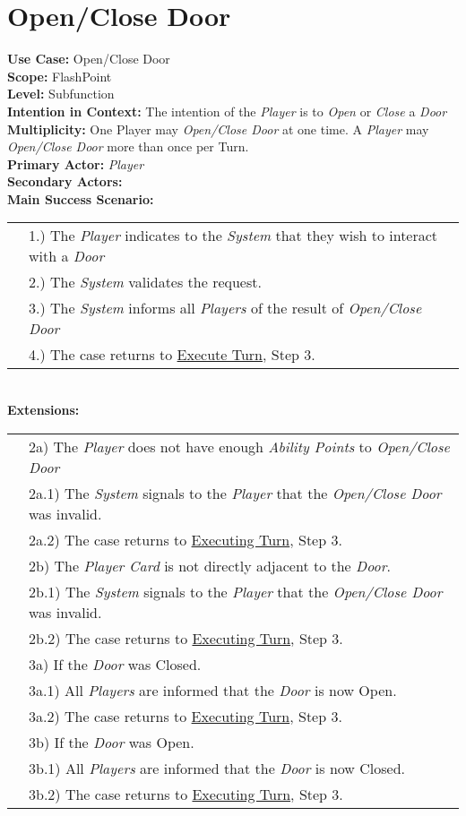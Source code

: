 \documentclass{article}
\begin{document}
	\section*{Open/Close Door}
	\textbf{Use Case:} Open/Close Door\\
	\textbf{Scope:} FlashPoint\\
	\textbf{Level:} Subfunction\\
	\textbf{Intention in Context:} The intention of the \textit{Player} is to \textit{Open} or \textit{Close} a \textit{Door} \\
	\textbf{Multiplicity: } One Player may \textit{Open/Close Door} at one time. A \textit{Player} may \textit{Open/Close Door} more than once per Turn.\\
	\textbf{Primary Actor:} \textit{Player}\\
	\textbf{Secondary Actors:}\\
	\textbf{Main Success Scenario:}\\
	\begin{tabular}{l l}
		&1.) The \textit{Player} indicates to the \textit{System} that they wish to interact with a \textit{Door} \\
		&2.) The \textit{System} validates the request. \\
		&3.) The \textit{System} informs all \textit{Players} of the result of \textit{Open/Close Door}\\
		&4.) The case returns to \underline{Execute Turn}, Step 3.\\
	\end{tabular}\\
	\textbf{Extensions: }\\
	\begin{tabular}{l l}
		&2a) The \textit{Player} does not have enough \textit{Ability Points} to \textit{Open/Close Door}\\
		&\qquad2a.1) The \textit{System} signals to the \textit{Player} that the \textit{Open/Close Door} was invalid.\\ 
		&\qquad2a.2) The case returns to \underline{Executing Turn}, Step 3.\\
		&2b) The \textit{Player Card} is not directly adjacent to the \textit{Door}.\\
		&\qquad2b.1) The \textit{System} signals to the \textit{Player} that the \textit{Open/Close Door} was invalid.\\ 
		&\qquad2b.2) The case returns to \underline{Executing Turn}, Step 3.\\
		&3a) If the \textit{Door} was Closed.\\
		&\qquad3a.1) All \textit{Players} are informed that the \textit{Door} is now Open.\\
		&\qquad3a.2) The case returns to \underline{Executing Turn}, Step 3.\\
		&3b) If the \textit{Door} was Open.\\
		&\qquad3b.1) All \textit{Players} are informed that the \textit{Door} is now Closed.\\
		&\qquad3b.2) The case returns to \underline{Executing Turn}, Step 3.\\
	\end{tabular}
	
\end{document}
